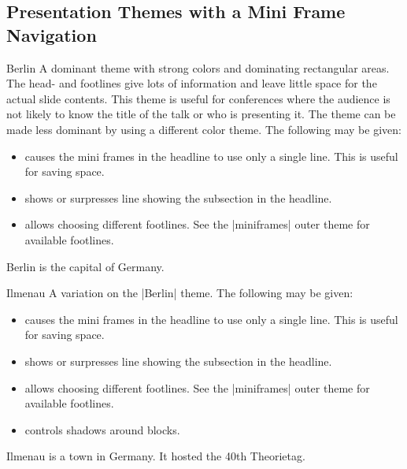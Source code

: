 \subsection{Presentation Themes with a Mini Frame Navigation}

\begin{themeexample}{Berlin}
  A dominant theme with strong colors and dominating rectangular areas. The head- and footlines give lots of information and leave little space for the actual slide contents. This theme is useful for conferences where the audience is not likely to know the title of the talk or who is presenting it. The theme can be made less dominant by using a different color theme. The following  may be given:
  \begin{itemize}
  \item {} causes the mini frames in the headline to use only a single line. This is useful for saving space.
  \item {} shows or surpresses line showing the subsection in the headline.
  \item {} allows choosing different footlines. See the |miniframes| outer theme for available footlines.
  \end{itemize}

  Berlin is the capital of Germany.
\end{themeexample}

\begin{themeexample}{Ilmenau}
  A variation on the |Berlin| theme. The following  may be given:
  \begin{itemize}
  \item {} causes the mini frames in the headline to use only a single line. This is useful for saving space.
  \item {} shows or surpresses line showing the subsection in the headline.
  \item {} allows choosing different footlines. See the |miniframes| outer theme for available footlines.
  \item {} controls shadows around blocks.
  \end{itemize}

  Ilmenau is a town in Germany. It hosted the 40th Theorietag.
\end{themeexample}

